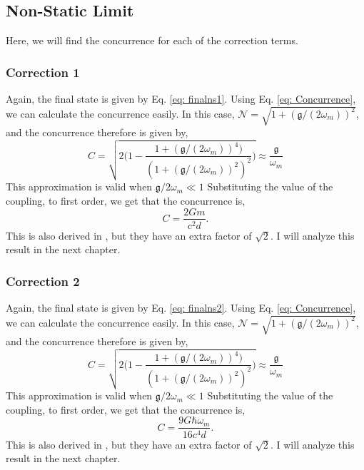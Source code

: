 \documentclass[12pt,a4paper]{report}
\theoremstyle{plain}
\theoremstyle{definition}
\theoremstyle{remark}
\begin{document}
\subsection{Non-Static Limit}
Here, we will find the concurrence for each of the correction terms.
\subsubsection{Correction 1}
Again, the final state is given by Eq.  \ref{eq: finalns1}.
Using Eq. \ref{eq: Concurrence}, we can calculate the concurrence easily.
In this case, $\mathcal{N} = \sqrt{1+(\mathfrak{g}/(2\omega_{m}))^{2}}$, and the concurrence therefore is given by,
\begin{equation}
    C = \sqrt{2\Bigg(1- \frac{1+(\mathfrak{g}/(2\omega_{m}))^{4})}{(1+(\mathfrak{g}/(2\omega_{m}))^{2})^2}\Bigg)} \approx \frac{\mathfrak{g}}{\omega_{m}}
\end{equation}
This approximation is valid when $\mathfrak{g}/2\omega_{m} \ll 1$ Substituting the value of the coupling, to first order, we get that the concurrence is,
\begin{equation}
    C = \frac{2Gm}{c^2d}.
\end{equation}
This is also derived in \citet{Bose_2022}, but they have an extra factor of $\sqrt{2}$. I will analyze this result in the next chapter.
\subsubsection{Correction 2}
Again, the final state is given by Eq. \ref{eq: finalns2}.
Using Eq. \ref{eq: Concurrence}, we can calculate the concurrence easily.
In this case, $\mathcal{N} = \sqrt{1+(\mathfrak{g}/(2\omega_{m}))^{2}}$, and the concurrence therefore is given by,
\begin{equation}
    C = \sqrt{2\Bigg(1- \frac{1+(\mathfrak{g}/(2\omega_{m}))^{4})}{(1+(\mathfrak{g}/(2\omega_{m}))^{2})^2}\Bigg)} \approx \frac{\mathfrak{g}}{\omega_{m}}
\end{equation}
This approximation is valid when $\mathfrak{g}/2\omega_{m} \ll 1$ Substituting the value of the coupling, to first order, we get that the concurrence is,
\begin{equation}
    C = \frac{9G\hbar\omega_m}{16c^4d}.
\end{equation}
This is also derived in \citet{Bose_2022}, but they have an extra factor of $\sqrt{2}$. I will analyze this result in the next chapter.
\end{document}

